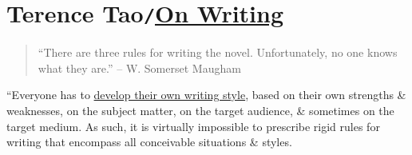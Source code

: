 \documentclass[oneside]{book}
\numberwithin{equation}{section}
\begin{document}

\chapter{Terence Tao\texttt{/}\href{https://terrytao.wordpress.com/advice-on-writing-papers/}{On Writing}}
\begin{quotation}
	``There are three rules for writing the novel. Unfortunately, no one knows what they are.'' -- W. Somerset Maugham
\end{quotation}
``Everyone has to \href{https://terrytao.wordpress.com/advice-on-writing-papers/write-in-your-own-voice/}{develop their own writing style}, based on their own strengths \& weaknesses, on the subject matter, on the target audience, \& sometimes on the target medium. As such, it is virtually impossible to prescribe rigid rules for writing that encompass all conceivable situations \& styles.
\end{document}
